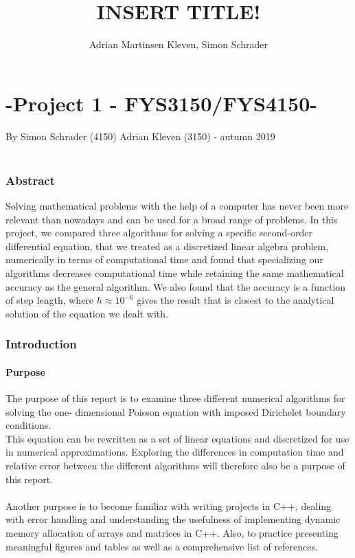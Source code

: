 \documentclass[10pt,a4paper]{article}
\author{Adrian Martinsen Kleven, Simon Schrader}
\title{INSERT TITLE!}
\begin{document}
\part*{-Project 1 - FYS3150/FYS4150-
}
{\large By Simon Schrader (4150) Adrian Kleven (3150) - autumn 2019
}\\\\
\tableofcontents

\listoffigures
\listoftables

 
\clearpage
 
\section{Abstract}
Solving mathematical problems with the help of a computer has never been more relevant than nowadays and can be used for a broad range of problems. In this project, we compared three algorithms for solving a specific second-order differential equation, that we treated as a discretized linear algebra problem, numerically in terms of computational time and found that specializing our algorithms decreases computational time while retaining the same mathematical accuracy as the general algorithm. We also found that the accuracy is a function of step length, where  $h \approx 10^{-6}$ gives the result that is closest to the analytical solution of the equation we dealt with.
\section{Introduction}
\subsection{Purpose} 
The purpose of this report is to examine three different numerical algorithms for solving the one- dimensional Poisson equation with imposed Dirichelet boundary conditions. \\This equation can be rewritten as a set of linear equations and discretized for use in numerical approximations. Exploring the differences in computation time and relative error between the different algorithms will therefore also be a purpose of this report.\\\\
Another purpose is to become familiar with writing projects in C++, dealing with error handling and understanding the usefulness of implementing dynamic memory allocation of arrays and matrices in C++. Also, to practice presenting meaningful figures and tables as well as a comprehensive list of references.
\end{document}
